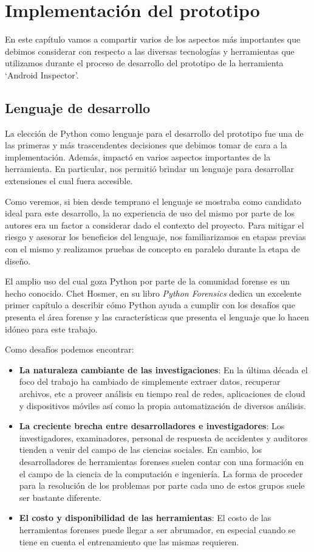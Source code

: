 \chapter{Implementación del prototipo}
En este capítulo vamos a compartir varios de los aspectos más importantes que debimos considerar con respecto a las diversas tecnologías y herramientas que utilizamos durante el proceso de desarrollo del prototipo de la herramienta \enquote*{Android Inspector}.

\section{Lenguaje de desarrollo}
La elección de Python como lenguaje para el desarrollo del prototipo fue una de las primeras y más trascendentes decisiones que debimos tomar de cara a la implementación. Además, impactó en varios aspectos importantes de la herramienta. En particular, nos permitió brindar un lenguaje para desarrollar extensiones el cual fuera accesible.

Como veremos, si bien desde temprano el lenguaje se mostraba como candidato ideal para este desarrollo, la no experiencia de uso del mismo por parte de los autores era un factor a considerar dado el contexto del proyecto. Para mitigar el riesgo y asesorar los beneficios del lenguaje, nos familiarizamos en etapas previas con el mismo y realizamos pruebas de concepto en paralelo durante la etapa de diseño.

El amplio uso del cual goza Python por parte de la comunidad forense es un hecho conocido. Chet Hosmer, en su libro \emph{Python Forensics} \cite{Hosmer20141} dedica un excelente primer capítulo a describir cómo Python ayuda a cumplir con los desafíos que presenta el área forense y las características que presenta el lenguaje que lo hacen idóneo para este trabajo.

Como desafíos podemos encontrar:

\begin{itemize}
\item \textbf{La naturaleza cambiante de las investigaciones}: En la última década el foco del trabajo ha cambiado de simplemente extraer datos, recuperar archivos, etc a proveer análisis en tiempo real de redes, aplicaciones de cloud y dispositivos móviles así como la propia automatización de diversos análisis.
\item \textbf{La creciente brecha entre desarrolladores e investigadores}: Los investigadores, examinadores, personal de respuesta de accidentes y auditores tienden a venir del campo de las ciencias sociales. En cambio, los desarrolladores de herramientas forenses suelen contar con una formación en el campo de la ciencia de la computación e ingeniería. La forma de proceder para la resolución de los problemas por parte cada uno de estos grupos suele ser bastante diferente.
\item \textbf{El costo y disponibilidad de las herramientas}: El costo de las herramientas forenses puede llegar a ser abrumador, en especial cuando se tiene en cuenta el entrenamiento que las mismas requieren.
\end{itemize}

